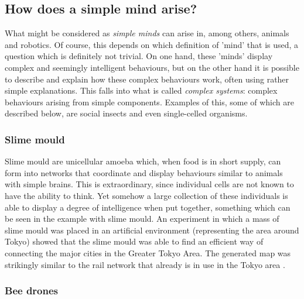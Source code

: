\documentclass[11pt]{article}
\newenvironment{draft}{\color{dark-cornflower-blue-2}}{\ignorespacesafterend}
\begin{document}
\subsection{How does a simple mind arise?}

\begin{draft}

What might be considered as \textit{simple minds} can arise in, among others, animals and robotics. Of course, this depends on which definition of 'mind' that is used, a question which is definitely not trivial. On one hand, these 'minds' display complex and seemingly intelligent behaviours, but on the other hand it is possible to describe and explain how these complex behaviours work, often using rather simple explanations. This falls into what is called \textit{complex systems}: complex behaviours arising from simple components. Examples of this, some of which are described below, are social insects and even single-celled organisms.

\end{draft}

\subsubsection*{Slime mould}

\begin{draft}

Slime mould are unicellular amoeba which, when food is in short supply, can form into networks that coordinate and display behaviours similar to animals with simple brains. This is extraordinary, since individual cells are not known to have the ability to think. Yet somehow a large collection of these individuals is able to display a degree of intelligence when put together, something which can be seen in the example with slime mould. An experiment in which a mass of slime mould was placed in an artificial environment (representing the area around Tokyo) showed that the slime mould was able to find an efficient way of connecting the major cities in the Greater Tokyo Area. The generated map was strikingly similar to the rail network that already is in use in the Tokyo area \cite{tero2010rules}.

\end{draft}

\subsubsection*{Bee drones}
\end{document}
